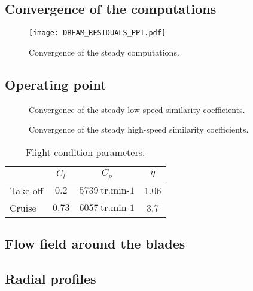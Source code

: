 
\subsection{Convergence of the computations} %
\label{sub:dream_convergence}

\begin{figure}[htb]
  \centering
  \texttt{[image: DREAM\_RESIDUALS\_PPT.pdf]}
  \caption{Convergence of the steady computations.}
  \label{fig:dream_operating_point}
\end{figure}

\subsection{Operating point} %
\label{sub:dream_operating_point}

\begin{figure}[htb]
  \centering
  \caption{Convergence of the steady low-speed similarity coefficients.}
  \label{fig:dream_ls_operating_point}
\end{figure}

\begin{figure}[htb]
  \centering
  \caption{Convergence of the steady high-speed similarity coefficients.}
  \label{fig:dream_hs_operating_point}
\end{figure}

\begin{table}[htbp]
   \centering
  \begin{tabular}{lccc}
    \toprule
    \phantom{abdefghijk}& $C_t$ & $C_p$ & $\eta$ \\
    \midrule
    Take-off & $0.2$ & $5739~\textrm{tr.min-1}$ & 1.06 \\
    Cruise & $0.73$ & $6057~\textrm{tr.min-1}$ & 3.7 \\
    \bottomrule
  \end{tabular}
  \caption{Flight condition parameters.}
  \label{tab:dream_flight_condition}
\end{table} 


\subsection{Flow field around the blades} %
\label{sub:dream_flow_field}

\subsection{Radial profiles} %
\label{sub:dream_radial_profiles}